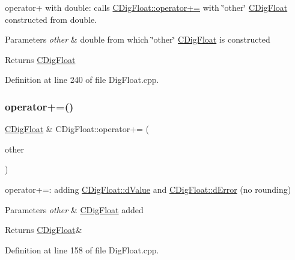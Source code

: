 operator+ with double\+: calls \hyperlink{classCDigFloat_a84b2ad9b4d1a75aae261074ed7c6fefe}{C\+Dig\+Float\+::operator+=} with \char`\"{}other\char`\"{} \hyperlink{classCDigFloat}{C\+Dig\+Float} constructed from double. 


\begin{DoxyParams}{Parameters}
{\em other} & double from which \char`\"{}other\char`\"{} \hyperlink{classCDigFloat}{C\+Dig\+Float} is constructed \\
\hline
\end{DoxyParams}
\begin{DoxyReturn}{Returns}
\hyperlink{classCDigFloat}{C\+Dig\+Float} 
\end{DoxyReturn}


Definition at line 240 of file Dig\+Float.\+cpp.

\mbox{\label{classCDigFloat_a84b2ad9b4d1a75aae261074ed7c6fefe}} 
\subsubsection{\texorpdfstring{operator+=()}{operator+=()}\hspace{0.1cm}{\footnotesize\ttfamily [1/2]}}
{\footnotesize\ttfamily \hyperlink{classCDigFloat}{C\+Dig\+Float} \& C\+Dig\+Float\+::operator+= (\begin{DoxyParamCaption}\item[{const \hyperlink{classCDigFloat}{C\+Dig\+Float} \&}]{other }\end{DoxyParamCaption})}



operator+=\+: adding \hyperlink{classCDigFloat_a4bbe69e30dd4e20527362493aa9aaf96}{C\+Dig\+Float\+::d\+Value} and \hyperlink{classCDigFloat_a25eb3782d1e727ff007a48f8308e3d4d}{C\+Dig\+Float\+::d\+Error} (no rounding) 


\begin{DoxyParams}{Parameters}
{\em other} & \hyperlink{classCDigFloat}{C\+Dig\+Float} added \\
\hline
\end{DoxyParams}
\begin{DoxyReturn}{Returns}
\hyperlink{classCDigFloat}{C\+Dig\+Float}\& 
\end{DoxyReturn}


Definition at line 158 of file Dig\+Float.\+cpp.



